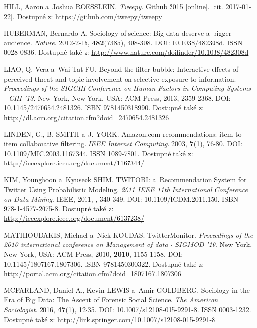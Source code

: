 \documentclass[12pt, a4paper]{article}
\numberwithin{equation}{section} 	%
\begin{document}
\begin{thebibliography}{99}
    HILL, Aaron a~Joshua ROESSLEIN. \textit{Tweepy}. Github 2015 [online]. [cit. 2017-01-22]. Dostupné z: \url{https://github.com/tweepy/tweepy}

    HUBERMAN, Bernardo A. Sociology of science: Big data deserve a~bigger audience. \textit{Nature}. 2012-2-15, \textbf{482}(7385), 308-308. DOI: 10.1038/482308d. ISSN 0028-0836. Dostupné také z: \url{http://www.nature.com/doifinder/10.1038/482308d}

    LIAO, Q. Vera a~Wai-Tat FU. Beyond the filter bubble: Interactive effects of perceived threat and topic involvement on selective exposure to information. \textit{Proceedings of the SIGCHI Conference on Human Factors in Computing Systems - CHI '13}. New York, New York, USA: ACM Press, 2013, 2359-2368. DOI: 10.1145/2470654.2481326. ISBN 9781450318990. Dostupné také z: \url{http://dl.acm.org/citation.cfm?doid=2470654.2481326}

    LINDEN, G., B. SMITH a~J. YORK. Amazon.com recommendations: item-to-item collaborative filtering. \textit{IEEE Internet Computing}. 2003, \textbf{7}(1), 76-80. DOI: 10.1109/MIC.2003.1167344. ISSN 1089-7801. Dostupné také z: \url{http://ieeexplore.ieee.org/document/1167344/}

    KIM, Younghoon a~Kyuseok SHIM. TWITOBI: a~Recommendation System for Twitter Using Probabilistic Modeling. \textit{2011 IEEE 11th International Conference on Data Mining}. IEEE, 2011, , 340-349. DOI: 10.1109/ICDM.2011.150. ISBN 978-1-4577-2075-8. Dostupné také z: \url{http://ieeexplore.ieee.org/document/6137238/}

    MATHIOUDAKIS, Michael a~Nick KOUDAS. TwitterMonitor. \textit{Proceedings of the 2010 international conference on Management of data - SIGMOD '10}. New York, New York, USA: ACM Press, 2010, \textbf{2010}, 1155-1158. DOI: 10.1145/1807167.1807306. ISBN 9781450300322. Dostupné také z: \url{http://portal.acm.org/citation.cfm?doid=1807167.1807306}

    MCFARLAND, Daniel A., Kevin LEWIS a~Amir GOLDBERG. Sociology in the Era of Big Data: The Ascent of Forensic Social Science. \textit{The American Sociologist}. 2016, \textbf{47}(1), 12-35. DOI: 10.1007/s12108-015-9291-8. ISSN 0003-1232. Dostupné také z: \url{http://link.springer.com/10.1007/s12108-015-9291-8}


\end{thebibliography}
\end{document}
